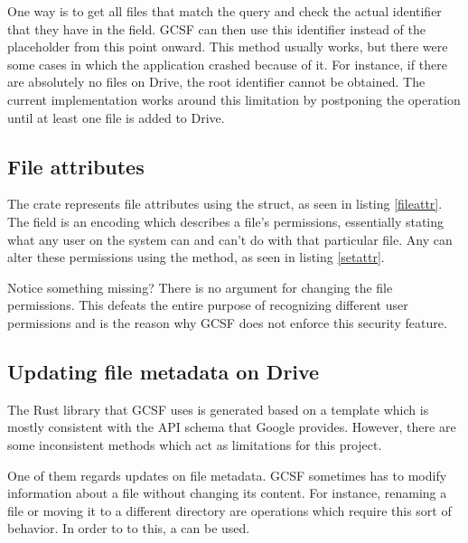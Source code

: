 One way is to get all files that match the  query and check the actual identifier that they have in the  field. GCSF can then use this identifier instead of the  placeholder from this point onward. This method usually works, but there were some cases in which the application crashed because of it. For instance, if there are absolutely no files on Drive, the root identifier cannot be obtained. The current implementation works around this limitation by postponing the operation until at least one file is added to Drive.

\subsection{File attributes}

The  crate represents file attributes using the  struct, as seen in listing \ref{fileattr}. The  field is an encoding which describes a file's permissions, essentially stating what any user on the system can and can't do with that particular file. Any  can alter these permissions using the  method, as seen in listing \ref{setattr}.





Notice something missing? There is no argument for changing the file permissions. This defeats the entire purpose of recognizing different user permissions and is the reason why GCSF does not enforce this security feature.

\subsection{Updating file metadata on Drive} \label{updating_metadata}

The Rust library that GCSF uses is generated based on a template which is mostly consistent with the API schema that Google provides. However, there are some inconsistent methods which act as limitations for this project.

One of them regards updates on file metadata. GCSF sometimes has to modify information about a file without changing its content. For instance, renaming a file or moving it to a different directory are operations which require this sort of behavior. In order to to this, a  can be used.

